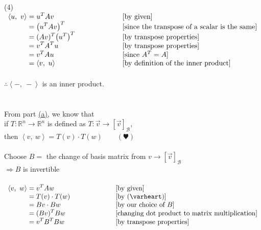 \documentclass[12pt]{article}
\newcommand{\R}{\mathbb{R}}
\newcommand{\innerproduct}[2]{\left\langle #1, \ #2\right\rangle}
\begin{document}
\\\\
(4)\\ {$\begin{array}{r@{}>{\displaystyle}ll}
		\langle u, \ v\rangle & {}= u^T A v                                & [\text{by given}]                                    \\
		                      & {}= \big(u^T A v\big)^T                    & [\text{since the transpose of a scalar is the same}] \\
		                      & {}= (Av)^T \big(u ^T\big)^T \hspace*{20mm} & [\text{by transpose properties}]                     \\
		                      & {}= v^T A^T u                              & [\text{by transpose properties}]                     \\
		                      & {}= v^T A u                                & [\text{since }A^T = A]                               \\
		                      & {}= \langle v, \ u\rangle                  & [\text{by definition of the inner product}]          \\
	\end{array}$}
\\\\
$\therefore \innerproduct{-}{-}$ is an inner product.
\\\\\\ \newpage \noindent
From part \hyperlink{3.1}{(a)}, we know that\\
if $T:\R^n \rightarrow \R^n$ is defined as $T:\vec{v} \rightarrow [\vec{v}]_\mathcal{B}$,\\
then $\innerproduct{v}{w} = T(v)\cdot T(w) \qquad (\varheart)$
\\\\
Choose $B = $ the change of basis matrix from $v \rightarrow [\vec{v}]_\mathcal{B}$\\
$\Longrightarrow B$ is invertible
\\\\
{$\begin{array}{r@{}>{\displaystyle}ll}
		\innerproduct{v}{w} & {}= v^T A w                       & [\text{by given}]                                      \\
		                    & {}= T(v)\cdot T(w) \hspace*{20mm} & [\text{by } (\varheart)]                               \\
		                    & {}= Bv\cdot Bw                    & [\text{by our choice of }B]                            \\
		                    & {}= (Bv)^T Bw                     & [\text{changing dot product to matrix multiplication}] \\
		                    & {}= v^T B^T Bw                    & [\text{by transpose properties}]                       \\
	\end{array}$}
\end{document}
